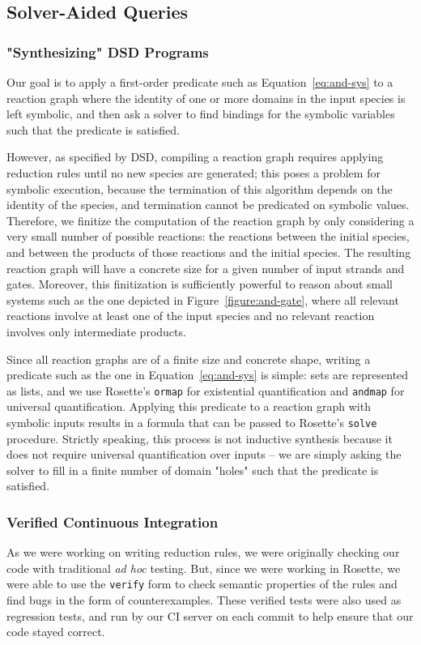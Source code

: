 \documentclass{article}[10pt]
\begin{document}
\subsection{Solver-Aided Queries}
\subsubsection{"Synthesizing" DSD Programs}
Our goal is to apply a first-order predicate such as Equation~\ref{eq:and-sys}
to a reaction graph where the identity of one or more domains in the input
species is left symbolic, and then ask a solver to find bindings for the
symbolic variables such that the predicate is satisfied.

However, as specified by DSD, compiling a reaction graph requires applying
reduction rules until no new species are generated; this poses a problem
for symbolic execution, because the termination of this algorithm
depends on the identity of the species, and termination cannot be
predicated on symbolic values. Therefore, we finitize the computation
of the reaction graph by only considering a very small number of possible
reactions: the reactions between the initial species, and between
the products of those reactions and the initial species. The
resulting reaction graph will have a concrete size for a given
number of input strands and gates. Moreover, this finitization
is sufficiently powerful to reason about small systems such as the one
depicted in Figure~\ref{figure:and-gate}, where all relevant reactions
involve at least one of the input species and no relevant reaction
involves only intermediate products.

Since all reaction graphs are of a finite size and concrete shape,
writing a predicate such as the one in Equation~\ref{eq:and-sys} is
simple: sets are represented as lists, and we use Rosette's \verb;ormap; for
existential quantification and \verb;andmap; for universal quantification.
Applying this predicate to a reaction graph with symbolic inputs results
in a formula that can be passed to Rosette's \verb;solve; procedure.
Strictly speaking, this process is not inductive synthesis because it
does not require universal quantification over inputs -- we are simply
asking the solver to fill in a finite number of domain "holes" such that the
predicate is satisfied.

\subsubsection{Verified Continuous Integration}
As we were working on writing reduction rules, we were originally
checking our code with traditional \emph{ad hoc} testing. But,
since we were working in Rosette, we were able to use the \verb;verify;
form to check semantic properties of the rules and find bugs in the
form of counterexamples.  These verified tests were also used as regression
tests, and run by our CI server on each commit to help ensure that our code
stayed correct.
\end{document}
